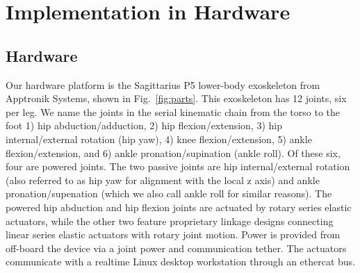 \documentclass[utf8]{frontiersSCNS}
\begin{document}
\section{Implementation in Hardware}\label{sec:exp}

\subsection{Hardware}

Our hardware platform is the Sagittarius P5 lower-body exoskeleton from Apptronik Systems, shown in Fig.~\ref{fig:parts}. This exoskeleton has 12 joints, six per leg. We name the joints in the serial kinematic chain from the torso to the foot 1) hip abduction/adduction, 2) hip flexion/extension, 3) hip internal/external rotation (hip yaw), 4) knee flexion/extension, 5) ankle flexion/extension, and 6) ankle pronation/supination (ankle roll). Of these six, four are powered joints. The two passive joints are hip internal/external rotation (also referred to as hip yaw for alignment with the local z axis) and ankle pronation/supenation (which we also call ankle roll for similar reasons). The powered hip abduction and hip flexion joints are actuated by rotary series elastic actuators, while the other two feature proprietary linkage designs connecting linear series elastic actuators with rotary joint motion. Power is provided from off-board the device via a joint power and communication tether. The actuators communicate with a realtime Linux desktop workstation through an ethercat bus.
\end{document}
